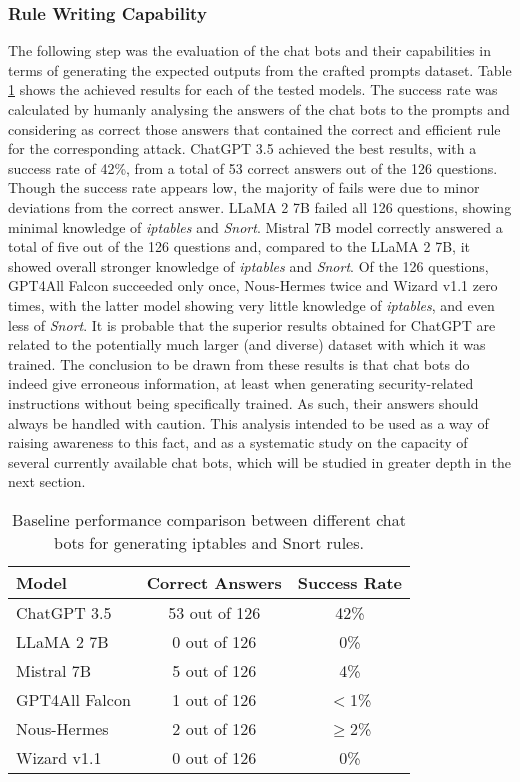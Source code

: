\documentclass[sigconf]{acmart}
\begin{document}
\subsubsection{Rule Writing Capability}
The following step was the evaluation of the chat bots and their capabilities in terms of generating the expected outputs from the crafted prompts dataset. Table \ref{tab:baseline} shows the achieved results for each of the tested models. The success rate was calculated by humanly analysing the answers of the chat bots to the prompts and considering as correct those answers that contained the correct and efficient rule for the corresponding attack. ChatGPT 3.5 achieved the best results, with a success rate of 42\%, from a total of 53 correct answers out of the 126 questions. Though the success rate appears low, the majority of fails were due to minor deviations from the correct answer. LLaMA 2 7B failed all 126 questions, showing minimal knowledge of \textit{iptables} and \textit{Snort}. Mistral 7B model correctly answered a total of five out of the 126 questions and, compared to the LLaMA 2 7B, it showed overall stronger knowledge of \textit{iptables} and \textit{Snort}. Of the 126 questions, GPT4All Falcon succeeded only once, Nous-Hermes twice and Wizard v1.1 zero times, with the latter model showing very little knowledge of \textit{iptables}, and even less of \textit{Snort}. It is probable that the superior results obtained for ChatGPT are related to the potentially much larger (and diverse) dataset with which it was trained. The conclusion to be drawn from these results is that chat bots do indeed give erroneous information, at least when generating security-related instructions without being specifically trained. As such, their answers should always be handled with caution. This analysis intended to be used as a way of raising awareness to this fact, and as a systematic study on the capacity of several currently available chat bots, which will be studied in greater depth in the next section.

\begin{table}[h]
  \caption{Baseline performance comparison between different chat bots for generating iptables and Snort rules.}
  \label{tab:baseline}
  \begin{tabular}{@{}lcc@{}}
    \toprule
    \textbf{Model} & \textbf{Correct Answers} & \textbf{Success Rate} \\
    \midrule
    ChatGPT 3.5    & 53 out of 126            & 42\%                  \\
    LLaMA 2 7B     & 0 out of 126             & 0\%                   \\
    Mistral 7B     & 5 out of 126             & 4\%                   \\
    GPT4All Falcon & 1 out of 126             & $<$1\%                \\
    Nous-Hermes    & 2 out of 126             & $\geq$2\%             \\
    Wizard v1.1    & 0 out of 126             & 0\%                   \\
    \bottomrule
  \end{tabular}
\end{table}
\end{document}
